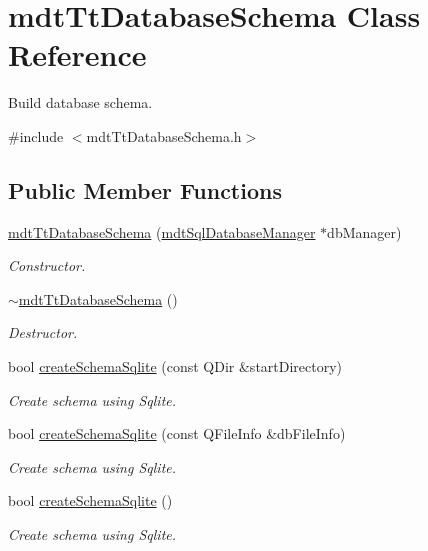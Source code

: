 \hypertarget{classmdt_tt_database_schema}{\section{mdt\-Tt\-Database\-Schema Class Reference}
\label{classmdt_tt_database_schema}
}


Build database schema.  




{\ttfamily \#include $<$mdt\-Tt\-Database\-Schema.\-h$>$}

\subsection*{Public Member Functions}
\begin{DoxyCompactItemize}
\item 
\hyperlink{classmdt_tt_database_schema_aa97c5fc104705a0ed9b941e40cf784cd}{mdt\-Tt\-Database\-Schema} (\hyperlink{classmdt_sql_database_manager}{mdt\-Sql\-Database\-Manager} $\ast$db\-Manager)
\begin{DoxyCompactList}\small\item\em Constructor. \end{DoxyCompactList}\item 
\hyperlink{classmdt_tt_database_schema_a5da7511641b7e81ef6981b442469b4ac}{$\sim$mdt\-Tt\-Database\-Schema} ()
\begin{DoxyCompactList}\small\item\em Destructor. \end{DoxyCompactList}\item 
bool \hyperlink{classmdt_tt_database_schema_a1b2638c661257fe8138ed5c4b3368027}{create\-Schema\-Sqlite} (const Q\-Dir \&start\-Directory)
\begin{DoxyCompactList}\small\item\em Create schema using Sqlite. \end{DoxyCompactList}\item 
bool \hyperlink{classmdt_tt_database_schema_ae2c6d44a90b472e773c1b952b11cc8fa}{create\-Schema\-Sqlite} (const Q\-File\-Info \&db\-File\-Info)
\begin{DoxyCompactList}\small\item\em Create schema using Sqlite. \end{DoxyCompactList}\item 
bool \hyperlink{classmdt_tt_database_schema_a14989dee0eb16a76f0630f8b820456e5}{create\-Schema\-Sqlite} ()
\begin{DoxyCompactList}\small\item\em Create schema using Sqlite. \end{DoxyCompactList}\item 

\end{DoxyCompactItemize}
